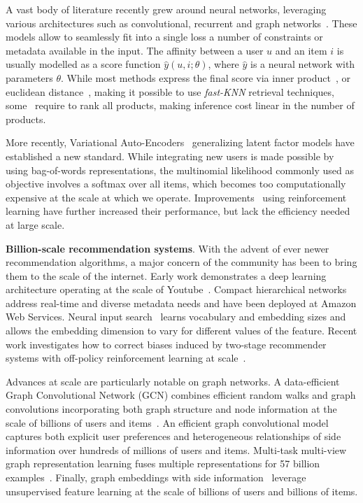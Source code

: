 \documentclass[sigconf]{acmart}
\begin{document}
A vast body of literature recently grew around neural networks, leveraging various architectures such as convolutional, recurrent and graph networks~\cite{deep-learning-karatzoglou-2017, deep-music-recommendation-nips, deep-survey, graph-networks-pinterest-kdd-2018, alibaba-intentgc-kdd-2019, alibaba-m2glr-kdd-2020, pixie-pinterest-www-2018, alibaba-ctr}. These models allow to seamlessly fit into a single loss a number of constraints or metadata available in the input. The affinity between a user $ u $ and an item $ i $ is usually modelled as a score function $ \hat{y}(u, i; \theta) $, where $ \hat{y} $ is a neural network with parameters $\theta $. While most methods express the final score via inner product~\cite{lightrec-www-2020,gramian}, or euclidean distance~\cite{cml-www}, making it possible to use \emph{fast-KNN} retrieval techniques, some~\cite{ncf-www-2017} require to rank all products, making inference cost linear in the number of products. 

More recently, Variational Auto-Encoders~\cite{variational-liang-2018,rec-vae,gated-vaes} generalizing latent factor models have established a new standard. While integrating new users is made possible by using bag-of-words representations, the multinomial likelihood commonly used as objective involves a softmax over all items, which becomes too computationally expensive at the scale at which we operate. Improvements~\cite{ract-cf} using reinforcement learning have further increased their performance, but lack the efficiency needed at large scale.

\textbf{Billion-scale recommendation systems}. With the advent of ever newer recommendation algorithms, a major concern of the community has been to bring them to the scale of the internet. Early work demonstrates a deep learning architecture operating at the scale of Youtube~\cite{deep-youtube}. Compact hierarchical networks~\cite{aws-hrnn-kdd-2020} address real-time and diverse metadata needs and have been deployed at Amazon Web Services. Neural input search~\cite{google-neural-search-kdd-2020} learns vocabulary and embedding sizes and allows the embedding dimension to vary for different values of the feature. Recent work investigates how
to correct biases induced by two-stage recommender systems with off-policy reinforcement learning at scale~\cite{off-policy-reco-www-2020}.  





Advances at scale are particularly notable on graph networks. A data-efficient Graph Convolutional Network (GCN) combines efficient random walks and graph convolutions incorporating both graph structure and node information at the scale of billions of users and items~\cite{graph-networks-pinterest-kdd-2018}. An efficient graph convolutional model~\cite{alibaba-intentgc-kdd-2019} captures both explicit user preferences and heterogeneous relationships of side information over hundreds of millions of users and items. Multi-task multi-view graph representation learning fuses multiple representations for 57 billion examples~\cite{alibaba-m2glr-kdd-2020}.  Finally, graph embeddings with side information~\cite{alibaba-graphs-kdd-2018} leverage unsupervised feature learning at the scale of billions of users and billions of items. 
\end{document}
